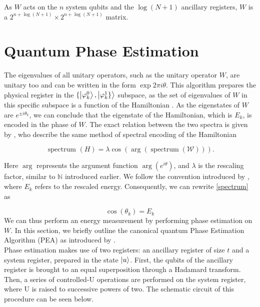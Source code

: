 As $W$ acts on the $n$ system qubits and the $\log(N + 1)$  ancillary registers, $W$ is a $ 2^{n+ \log(N+1)} \times 2^{n + \log(N+1)}$ matrix.
\section{Quantum Phase Estimation}

The eigenvalues of all unitary operators, such as the unitary operator $W$, are unitary too and can be written in the form $\exp{2\pi i \theta}$. This algorithm prepares the physical register in the $\{\left\vert{\varphi_k^0}\right\rangle, \left\vert{\varphi_k^1\}}\right\rangle$ subspace, as the set of eigenvalues of $W$ in this specific subspace is a function of the Hamiltonian \cite{Poulin}. As the eigenstates of $W$ are $e^{\pm i \theta_k}$, we can conclude that the eigenstate of the Hamiltonian, which is $E_k$, is encoded in the phase of $W$. The exact relation between the two spectra is given by \textcite{Babbush_2018}, who describe the same method of spectral encoding of the Hamiltonian

\begin{equation}
\label{spectrum}
\text { spectrum }(H)=\lambda \cos (\arg (\operatorname{spectrum}(\mathcal{W}))).
\end{equation}

Here $\arg$ represents the argument function $\arg(e^{i\theta})$, and $\lambda$ is the rescaling factor, similar to $\mathbb{N}$ introduced earlier. We follow the convention introduced by \textcite{poulin}, where $E_k$ refers to the rescaled energy. Consequently, we can rewrite \ref{spectrum} as

\begin{equation}
\cos(\theta_k) = E_k
\end{equation}
We can thus perform an energy measurement by performing phase estimation on $W$. In this section, we briefly outline the canonical quantum Phase Estimation Algorithm (PEA) as introduced by \textcite{nielsen}.\\

Phase estimation makes use of two registers: an ancillary register of size $t$ and a system register, prepared in the state $\left\vert{u}\right\rangle$. First, the qubits of the ancillary register is brought to an equal superposition through a Hadamard transform. Then, a series of controlled-U operations are performed on the system register, where U is raised to successive powers of two. The schematic circuit of this procedure can be seen below.


